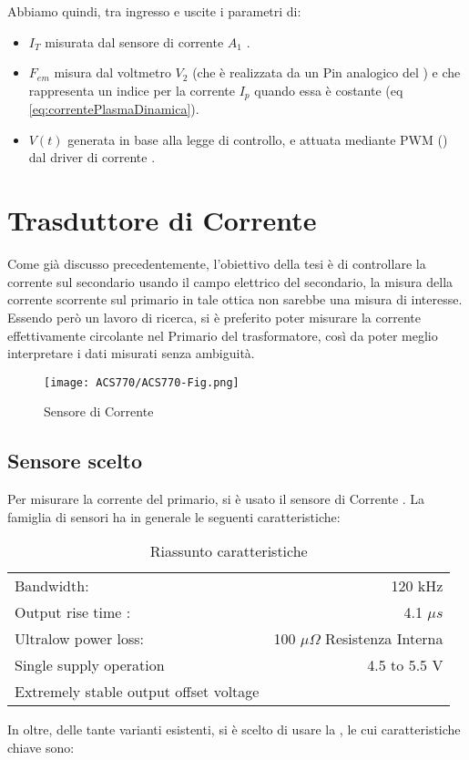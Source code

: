 Abbiamo quindi, tra ingresso e uscite i parametri di:
\begin{itemize}
	\item $I_T$ misurata dal sensore di corrente $ A_1 $ .
	\item $F_{em}$ misura dal voltmetro $V_2$ (che è realizzata da un Pin analogico del \microControllore) e che rappresenta un indice per  la corrente $I_p$ quando essa è costante (eq \ref{eq:correntePlasmaDinamica}).
	\item $V(t)$ generata in base alla legge di controllo, e attuata mediante PWM (\cite{modulazionePWM}) dal driver di corrente .
\end{itemize}


\newpage


\section{Trasduttore di Corrente}\label{CurrentSense}
Come già discusso precedentemente, l'obiettivo della tesi è di controllare la corrente sul secondario usando il campo elettrico del secondario, la misura della corrente scorrente sul primario in tale ottica non sarebbe una misura di interesse. Essendo però un lavoro di ricerca, si è preferito poter misurare la corrente effettivamente circolante nel Primario del trasformatore, così da poter meglio interpretare i dati misurati senza ambiguità.
\begin{figure}[H]
	\centering
	\caption[Sensore di Corrente ]{Sensore di Corrente}
	\texttt{[image: ACS770/ACS770-Fig.png]}
\end{figure}
\subsection{Sensore scelto}
Per misurare la corrente del primario, si è usato il sensore di Corrente \cite{ACS770}. La famiglia di sensori ha in generale le seguenti caratteristiche:
\begin{table}[H]
	\centering
	\label{tab:ACS770ParametriGenerali}
	\caption[\cite{ACS770}  Riassunto caratteristiche]{Riassunto caratteristiche}
	\begin{tabular}[t]{|l r|}
		\hline
		Bandwidth:                             & 120 kHz                               \\
		Output rise time :                     & 4.1 $ \mu s $                         \\
		Ultralow power loss:                   & 100 $ \mu \Omega $ Resistenza Interna \\
		Single supply operation                & 4.5 to 5.5 V                          \\
		Extremely stable output offset voltage &                                       \\
		\hline
	\end{tabular}
\end{table}
\noindent
In oltre, delle tante varianti esistenti, si è scelto di usare la , le cui caratteristiche chiave sono:

